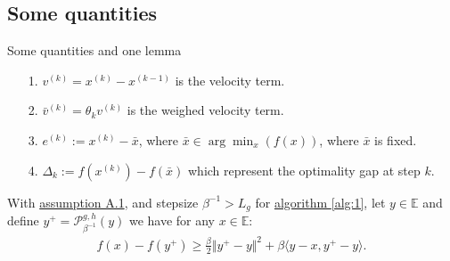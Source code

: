 \documentclass[11pt]{beamer}
\begin{document}
    \subsection{Some quantities}
        \begin{frame}{Some quantities and one lemma}
            \begin{itemize}
                \item [1.] $v^{(k)} = x^{(k)} - x^{(k -1)}$ is the velocity term. 
                \pause\item [2.] $\bar v^{(k)}= \theta_k v^{(k)}$ is the weighed velocity term. 
                \pause\item [3.] $e^{(k)} := x^{(k)} - \bar x$, where $\bar x \in \arg\min_{x}(f(x))$, where $\bar x$ is fixed.
                \pause\item [4.] $\Delta_k := f(x^{(k)}) - f(\bar x)$ which represent the optimality gap at step $k$. 
            \end{itemize}
            
            \begin{lemma}\label{lemma:prox_two_p}
                With \hyperref[assumption:1]{assumption A.1}, and stepsize $\beta^{-1} > L_g$ for \hyperref[alg:1]{algorithm \ref*{alg:1}}, let $y\in \mathbb E$ and define $y^+ = \mathcal P_{\beta^{-1}}^{g, h}(y)$ we have for any $x\in \mathbb E$: 
                \begin{align*}
                    f(x) - f(y^+) \ge \frac{\beta}{2}\Vert y^+ - y\Vert^2 + 
                    \beta \langle y - x, y^+ - y\rangle. 
                \end{align*}
            \end{lemma}
        \end{frame}
\end{document}
